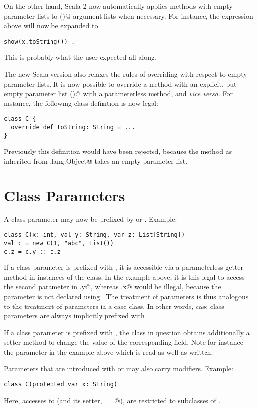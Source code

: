 \documentclass[a4paper,11pt,twoside]{article}
\begin{document}
On the other hand, Scala 2 now automatically applies methods
with empty parameter lists to \lstinline@()@ argument lists when
necessary. For instance, the \lstinline@show@ expression above will
now be expanded to
\begin{lstlisting}
show(x.toString()) .
\end{lstlisting}
This is probably what the user expected all along.

The new Scala version also relaxes the rules of overriding with
respect to empty parameter lists. It is now possible to override a
method with an explicit, but empty parameter list \lstinline@()@ with
a parameterless method, and {\em vice versa}. For instance, 
the following class definition is now legal:
\begin{lstlisting}
class C {
  override def toString: String = ...
}
\end{lstlisting}
Previously this definition would have been rejected, because the
\lstinline@toString@ method as inherited from
\lstinline@java.lang.Object@ takes an empty parameter list.  

\section{Class Parameters}

A class parameter may now be prefixed by \lstinline@val@ or
\lstinline@var@. Example:
\begin{lstlisting}
class C(x: int, val y: String, var z: List[String])
val c = new C(1, "abc", List())
c.z = c.y :: c.z
\end{lstlisting}
If a class parameter is prefixed with \lstinline@val@, it is
accessible via a parameterless getter method in instances of the
class.  In the example above, it is this legal to access the second
parameter in \lstinline@c.y@, whereas \lstinline@c.x@ would be
illegal, because the \lstinline@x@ parameter is not declared using
\lstinline@val@. The treatment of \lstinline@val@ parameters is thus
analogous to the treatment of parameters in a case class. In other words,
case class parameters are always implicitly prefixed with \lstinline@val@.

If a class parameter is prefixed with \lstinline@var@, the class in
question obtains additionally a setter method to change the value of
the corresponding field. Note for instance the \lstinline@z@ parameter
in the example above which is read as well as written.

Parameters that are introduced with \lstinline@val@ or \lstinline@var@
may also carry modifiers. Example:
\begin{lstlisting}
class C(protected var x: String)
\end{lstlisting}
Here, accesses to \lstinline@x@ (and its setter, \lstinline@x_=@), are
restricted to subclasses of \lstinline@C@.
\end{document}
